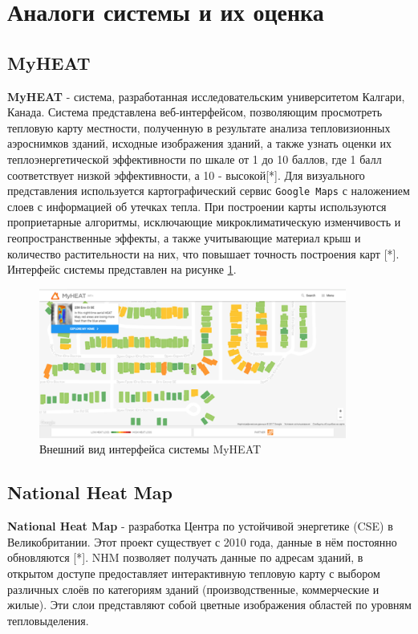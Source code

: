 \section{Аналоги системы и их оценка}

\subsection{MyHEAT}

\par
	\textbf{MyHEAT} - система, разработанная исследовательским университетом Калгари, Канада. Система представлена веб-интерфейсом, позволяющим просмотреть тепловую карту местности, полученную в результате анализа тепловизионных аэроснимков зданий, исходные изображения зданий, а также узнать оценки их теплоэнергетической эффективности по шкале от 1 до 10 баллов, где 1 балл соответствует низкой эффективности, а 10 - высокой[*]. Для визуального представления используется картографический сервис \texttt{Google Maps} с наложением слоев с информацией об утечках тепла. При построении карты используются проприетарные алгоритмы, исключающие микроклиматическую изменчивость и геопространственные эффекты, а также учитывающие материал крыш и количество растительности на них, что повышает точность построения карт [*]. Интерфейс системы представлен на рисунке \ref{screens:myheat}.

	\begin{figure}[h!]
      \centering
      \includegraphics[width=0.9\textwidth]{images/screens/0_myheat.png}
      \caption{Внешний вид интерфейса системы MyHEAT}
      \label{screens:myheat}
    \end{figure}

\subsection{National Heat Map}

\par
	\textbf{National Heat Map} - разработка Центра по устойчивой энергетике (CSE) в Великобритании. Этот проект существует с 2010 года, данные в нём постоянно обновляются [*]. NHM позволяет получать данные по адресам зданий, в открытом доступе предоставляет интерактивную тепловую карту с выбором различных слоёв по категориям зданий (производственные, коммерческие и жилые). Эти слои представляют собой цветные изображения областей по уровням тепловыделения.

